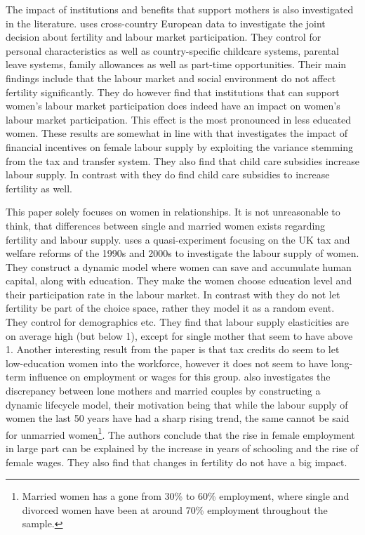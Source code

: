The impact of institutions and benefits that support mothers is also investigated in the literature. \textcite{del_boca_motherhood_2009}  uses cross-country European data to investigate the joint decision about fertility and labour market participation. They control for personal characteristics as well as country-specific childcare systems, parental leave systems, family allowances as well as part-time opportunities. Their main findings include that the labour market and social environment do not affect fertility significantly. They do however find that institutions that can support women's labour market participation does indeed have an impact on women's labour market participation. This effect is the most pronounced in less educated women. These results are somewhat in line with \textcite{haan_can_2009} that investigates the impact of financial incentives on female labour supply by exploiting the variance stemming from the tax and transfer system. They also find that child care subsidies increase labour supply. In contrast with \textcite{del_boca_motherhood_2009} they do find child care subsidies to increase fertility as well.

This paper solely focuses on women in relationships. It is not unreasonable to think, that differences between single and married women exists regarding fertility and labour supply. \textcite{blundell_female_2016} uses a quasi-experiment focusing on the UK tax and welfare reforms of the 1990s and 2000s to investigate the labour supply of women. They construct a dynamic model where women can save and accumulate human capital, along with education. They make the women choose education level and their participation rate in the labour market. In contrast with \textcite{francesconi_joint_2002} they do not let fertility be part of the choice space, rather they model it as a random event. They control for demographics etc. They find that labour supply elasticities are on average high (but below 1), except for single mother that seem to have above 1. Another interesting result from the paper is that tax credits do seem to let low-education women into the workforce, however it does not seem to have long-term influence on employment or wages for this group. \textcite{eckstein_dynamic_2011} also investigates the discrepancy between lone mothers and married couples by constructing a dynamic lifecycle model, their motivation being that while the labour supply of women the last 50 years have had a sharp rising trend, the same cannot be said for unmarried women\footnote{Married women has a gone from 30\% to 60\% employment, where single and divorced women have been at around 70\% employment throughout the sample.}. The authors conclude that the rise in female employment in large part can be explained by the increase in years of schooling and the rise of female wages. They also find that changes in fertility do not have a big impact. 

